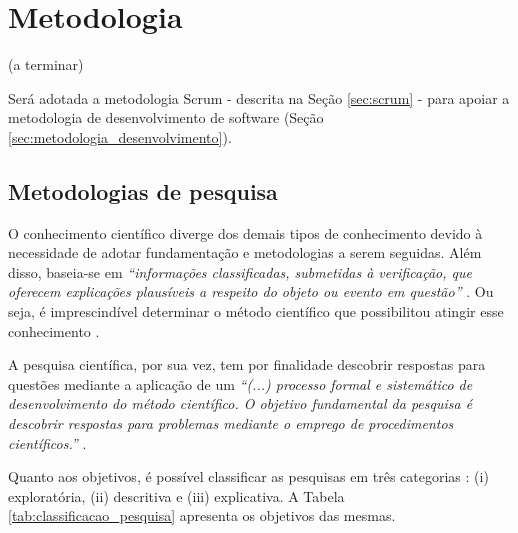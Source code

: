 \chapter[Metodologia]{Metodologia}\label{ch:metodologia}

(a terminar)


Será adotada a metodologia Scrum - descrita na Seção \ref{sec:scrum} - para apoiar a metodologia de desenvolvimento de software (Seção \ref{sec:metodologia_desenvolvimento}).

\section{Metodologias de pesquisa}

O conhecimento científico diverge dos demais tipos de conhecimento devido à necessidade de adotar fundamentação e metodologias a serem seguidas. Além disso, baseia-se em \textit{“informações classificadas, submetidas à verificação, que oferecem explicações plausíveis a respeito do objeto ou evento em questão”} \cite[pág. 22]{prodanov2013}. Ou seja, é imprescindível determinar o método científico que possibilitou atingir esse conhecimento \cite[pág. 24]{prodanov2013}. 

A pesquisa científica, por sua vez, tem por finalidade descobrir respostas para questões mediante a aplicação de um \textit{“(...) processo formal e sistemático de desenvolvimento do método científico. O objetivo fundamental da pesquisa é descobrir respostas para problemas mediante o emprego de procedimentos científicos.”}  \cite[pág. 26]{gil2008}.

Quanto aos objetivos, é possível classificar as pesquisas em três categorias \cite[pág. 41]{gil2002}: (i) exploratória, (ii) descritiva e (iii) explicativa. A Tabela \ref{tab:classificacao_pesquisa} apresenta os objetivos das mesmas.

